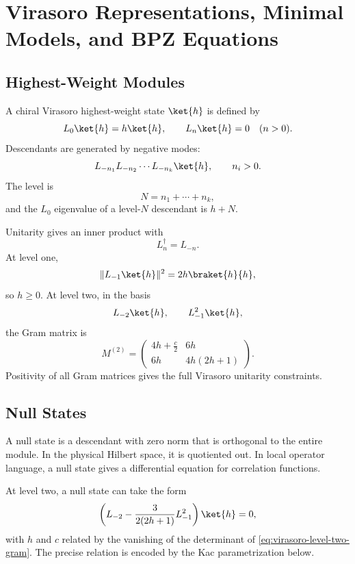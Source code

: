 \chapter{Virasoro Representations, Minimal Models, and BPZ Equations}
\label{ch:volume-iii-virasoro-representations-bpz}

\section{Highest-Weight Modules}

A chiral Virasoro highest-weight state \(\ket{h}\) is defined by
\[
  L_0\ket{h}=h\ket{h},
  \qquad
  L_n\ket{h}=0\quad(n>0).
\]
Descendants are generated by negative modes:
\[
  L_{-n_1}L_{-n_2}\cdots L_{-n_k}\ket{h},
  \qquad
  n_i>0.
\]
The level is
\[
  N=n_1+\cdots+n_k,
\]
and the \(L_0\) eigenvalue of a level-\(N\) descendant is \(h+N\).

Unitarity gives an inner product with
\[
  L_n^\dagger=L_{-n}.
\]
At level one,
\[
  \|L_{-1}\ket{h}\|^2=2h\braket{h}{h},
\]
so \(h\ge0\).  At level two, in the basis
\[
  L_{-2}\ket{h},
  \qquad
  L_{-1}^2\ket{h},
\]
the Gram matrix is
\begin{equation}
  M^{(2)}
  =
  \begin{pmatrix}
    4h+\frac c2 & 6h\\
    6h & 4h(2h+1)
  \end{pmatrix}.
  \label{eq:virasoro-level-two-gram}
\end{equation}
Positivity of all Gram matrices gives the full Virasoro unitarity
constraints.

\section{Null States}

A null state is a descendant with zero norm that is orthogonal to the entire
module.  In the physical Hilbert space, it is quotiented out.  In local
operator language, a null state gives a differential equation for correlation
functions.

At level two, a null state can take the form
\begin{equation}
  \left(
    L_{-2}
    -
    \frac{3}{2(2h+1)}L_{-1}^2
  \right)\ket{h}=0,
  \label{eq:level-two-null-vector}
\end{equation}
with \(h\) and \(c\) related by the vanishing of the determinant of
\eqref{eq:virasoro-level-two-gram}.  The precise relation is encoded by the
Kac parametrization below.

